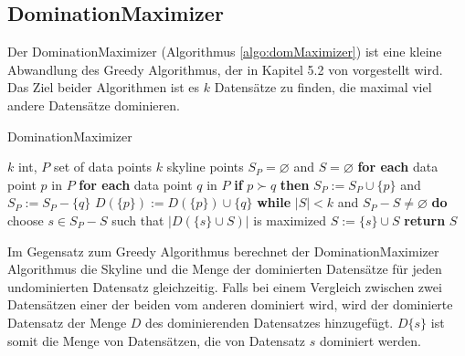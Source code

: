 \subsection{DominationMaximizer}
\label{ch:Analyse:sec:repSkyAlgos:subsec:domMax}
Der DominationMaximizer (Algorithmus \ref{algo:domMaximizer}) ist eine kleine Abwandlung des Greedy Algorithmus, der in Kapitel 5.2 von \cite{4221657} vorgestellt wird. 
Das Ziel beider Algorithmen ist es $k$ Datensätze zu finden, die maximal viel andere Datensätze dominieren.

\begin{algorithm}[H]
\caption{DominationMaximizer}\label{algo:domMaximizer}
\begin{algorithmic}[1]
\INPUTBF $k$ int, $P$ set of data points
\OUTPUTBF $k$ skyline points
\State $S_P = \varnothing$ and $S = \varnothing$
\State \textbf{for each} data point $p$ in $P$ 
\State \hspace{\algorithmicindent} \textbf{for each} data point $q$ in $P$
\State \hspace{\algorithmicindent} \hspace{\algorithmicindent} \textbf{if} $p \succ q$ \textbf{then} 
\State \hspace{\algorithmicindent} \hspace{\algorithmicindent} \hspace{\algorithmicindent} $S_P:= S_P \cup \{p\}$ and $S_P:= S_P-\{q\}$
\State \hspace{\algorithmicindent} \hspace{\algorithmicindent} \hspace{\algorithmicindent} $D(\{p\}):=D(\{p\}) \cup \{q\}$  
\State \textbf{while} $|S|<k$ and $S_P-S \neq \varnothing$ \textbf{do}
\State \hspace{\algorithmicindent} choose $s \in {S_P-S}$ such that $|D(\{s\} \cup S)|$ is maximized
\State \hspace{\algorithmicindent} $S:=\{s\} \cup S$
\State \textbf{return} $S$
\end{algorithmic}
\end{algorithm}

Im Gegensatz zum Greedy Algorithmus berechnet der DominationMaximizer Algorithmus die Skyline und die Menge der dominierten Datensätze für jeden undominierten Datensatz gleichzeitig. Falls bei einem Vergleich zwischen zwei Datensätzen einer der beiden vom anderen dominiert wird, wird der dominierte Datensatz der Menge $D$ des dominierenden Datensatzes hinzugefügt. $D\{s\}$ ist somit die Menge von Datensätzen, die von Datensatz $s$ dominiert werden. 

